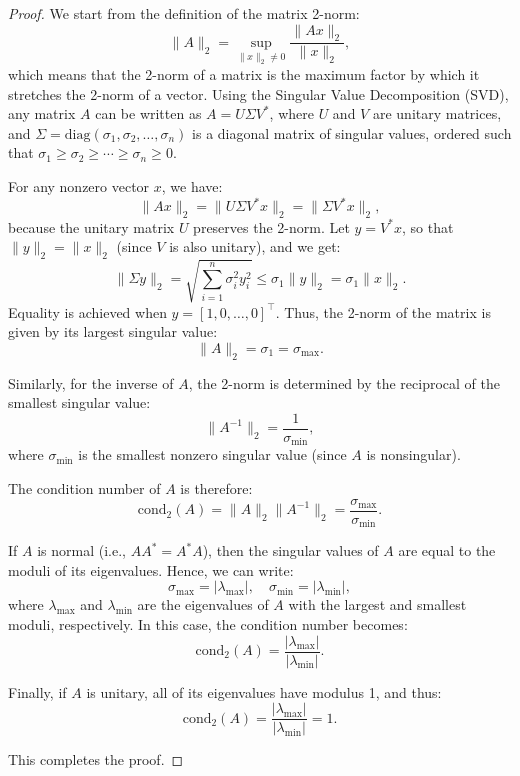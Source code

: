 \documentclass[a4paper]{article}
\begin{document}
\begin{proof}

  We start from the definition of the matrix 2-norm:  
  \[
  \|A\|_2 = \sup_{\|x\|_2 \neq 0} \frac{\|Ax\|_2}{\|x\|_2},
  \]
  which means that the 2-norm of a matrix is the maximum factor by which it stretches the 2-norm of a vector. Using the Singular Value Decomposition (SVD), any matrix \(A\) can be written as \(A = U \Sigma V^*\), where \(U\) and \(V\) are unitary matrices, and \(\Sigma = \text{diag}(\sigma_1, \sigma_2, \dots, \sigma_n)\) is a diagonal matrix of singular values, ordered such that \(\sigma_1 \geq \sigma_2 \geq \cdots \geq \sigma_n \geq 0\).
  
  For any nonzero vector \(x\), we have:
  \[
  \|Ax\|_2 = \|U \Sigma V^* x\|_2 = \|\Sigma V^* x\|_2,
  \]
  because the unitary matrix \(U\) preserves the 2-norm. Let \(y = V^*x\), so that \(\|y\|_2 = \|x\|_2\) (since \(V\) is also unitary), and we get:
  \[
  \|\Sigma y\|_2 = \sqrt{\sum_{i=1}^n \sigma_i^2 y_i^2} \leq \sigma_1 \|y\|_2 = \sigma_1 \|x\|_2.
  \]
  Equality is achieved when \(y = [1, 0, \dots, 0]^\top\). Thus, the 2-norm of the matrix is given by its largest singular value:
  \[
  \|A\|_2 = \sigma_1 = \sigma_{\text{max}}.
  \]
  
  Similarly, for the inverse of \(A\), the 2-norm is determined by the reciprocal of the smallest singular value:
  \[
  \|A^{-1}\|_2 = \frac{1}{\sigma_{\text{min}}},
  \]
  where \(\sigma_{\text{min}}\) is the smallest nonzero singular value (since \(A\) is nonsingular).
  
  The condition number of \(A\) is therefore:
  \[
  \text{cond}_2(A) = \|A\|_2 \|A^{-1}\|_2 = \frac{\sigma_{\text{max}}}{\sigma_{\text{min}}}.
  \]
  
  If \(A\) is normal (i.e., \(A A^* = A^* A\)), then the singular values of \(A\) are equal to the moduli of its eigenvalues. Hence, we can write:
  \[
  \sigma_{\text{max}} = |\lambda_{\text{max}}|, \quad \sigma_{\text{min}} = |\lambda_{\text{min}}|,
  \]
  where \(\lambda_{\text{max}}\) and \(\lambda_{\text{min}}\) are the eigenvalues of \(A\) with the largest and smallest moduli, respectively. In this case, the condition number becomes:
  \[
  \text{cond}_2(A) = \frac{|\lambda_{\text{max}}|}{|\lambda_{\text{min}}|}.
  \]
  
  Finally, if \(A\) is unitary, all of its eigenvalues have modulus 1, and thus:
  \[
  \text{cond}_2(A) = \frac{|\lambda_{\text{max}}|}{|\lambda_{\text{min}}|} = 1.
  \]
  
  This completes the proof.

\end{proof}
\end{document}
